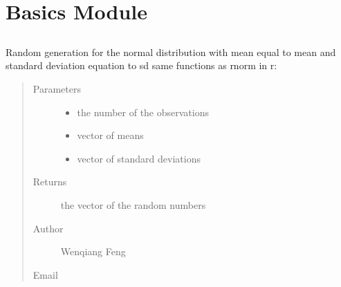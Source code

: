 \documentclass[letterpaper,12pt,english]{sphinxmanual}
\begin{document}
\section{Basics Module}
\label{\detokenize{api:basics-module}}

\subsection{}
\label{\detokenize{api:module-statspy.basics}}\label{\detokenize{api:rnorm}}

\begin{fulllineitems}
\label{\detokenize{api:statspy.basics.rnorm}}
Random generation for the normal distribution with mean
equal to mean and standard deviation equation to sd
same functions as rnorm in r: 
\begin{quote}\begin{description}
\item[{Parameters}] \leavevmode\begin{itemize}
\item {} 
 \textendash{} the number of the observations

\item {} 
 \textendash{} vector of means

\item {} 
 \textendash{} vector of standard deviations

\end{itemize}

\item[{Returns}] \leavevmode
the vector of the random numbers

\item[{Author}] \leavevmode
Wenqiang Feng

\item[{Email}] \leavevmode
{}

\end{description}\end{quote}

\end{fulllineitems}
\end{document}
